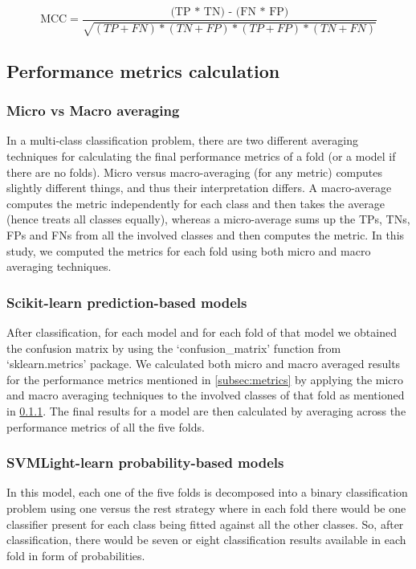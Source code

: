     \begin{equation}
        \text{MCC} = \frac {\text{(TP * TN) - (FN * FP)}}{\sqrt{(TP + FN) * (TN + FP) * (TP + FP) * (TN + FN)}}
    \end{equation}

    \subsection{Performance metrics calculation}
        \subsubsection{Micro vs Macro averaging}
        \label{subsubsec:micromacro}
        In a multi-class classification problem, there are two different averaging techniques for calculating the final 
        performance metrics of a fold (or a model if there are no folds). Micro versus macro-averaging (for any metric) 
        computes slightly different things, and thus their interpretation differs. A macro-average computes the metric 
        independently for each class and then takes the average (hence treats all classes equally), whereas a micro-average 
        sums up the TPs, TNs, FPs and FNs from all the involved classes and then computes the metric. In this study,
        we computed the metrics for each fold using both micro and macro averaging techniques.\\

        \subsubsection{Scikit-learn prediction-based models}
        After classification, for each model and for each fold of that model we obtained the confusion matrix by using 
        the `confusion\_matrix' function from `sklearn.metrics' package. We calculated both micro and macro averaged 
        results for the performance metrics mentioned in \ref{subsec:metrics} by applying the micro and macro averaging 
        techniques to the involved classes of that fold as mentioned in \ref{subsubsec:micromacro}. 
        The final results for a model are then calculated by averaging across the performance metrics of all the five folds.\\

        \subsubsection{SVMLight-learn probability-based models}
        \label{subsub:svmmetrics}
        In this model, each one of the five folds is decomposed into a binary classification problem using one versus the rest 
        strategy where in each fold there would be one classifier present for each class being fitted against all the other classes.
        So, after classification, there would be seven or eight classification results available in each fold in form of probabilities.\\

